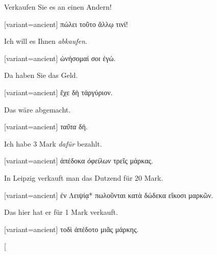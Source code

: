 Verkaufen Sie es an einen Andern! 

\switchcolumn

\begin{greek}[variant=ancient]%
πώλει τοῦτο ἄλλῳ τινί!

\end{greek}%
\switchcolumn*

Ich will es Ihnen \emph{abkaufen}. 

\switchcolumn

\begin{greek}[variant=ancient]%
ὠνήσομαί \emph{σοι} ἐγώ.

\end{greek}%
\switchcolumn*

Da haben Sie das Geld. 

\switchcolumn

\begin{greek}[variant=ancient]%
ἔχε δὴ τἀργύριον.

\end{greek}%
\switchcolumn*

Das wäre abgemacht. 

\switchcolumn

\begin{greek}[variant=ancient]%
\emph{ταῦτα} δή.

\end{greek}%
\switchcolumn*

Ich habe 3 Mark \emph{dafür} bezahlt. 

\switchcolumn

\begin{greek}[variant=ancient]%
ἀπέδοκα \emph{ὀφείλων} τρεῖς μάρκας.

\end{greek}%
\switchcolumn*

In Leipzig verkauft man das Dutzend für 20 Mark. 

\switchcolumn

\begin{greek}[variant=ancient]%
ἐν Λειψίᾳ{*} πωλοῦνται κατὰ δώδεκα εἴκοσι μαρκῶν.

\end{greek}%
\switchcolumn*

Das hier hat er für 1 Mark verkauft. 

\switchcolumn

\begin{greek}[variant=ancient]%
τοδὶ ἀπέδοτο μιᾶς μάρκης.

\end{greek}%
\switchcolumn*[


